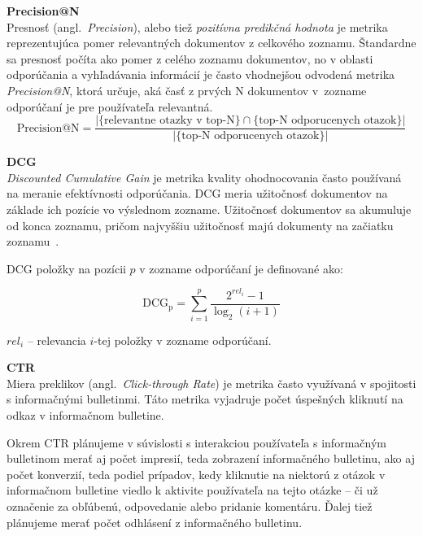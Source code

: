 \textbf{Precision@N}\\
Presnosť (angl.~\emph{Precision}), alebo tiež \textit{pozitívna predikčná hodnota} je metrika reprezentujúca pomer relevantných
dokumentov z celkového zoznamu. Štandardne sa presnosť počíta ako pomer z celého zoznamu dokumentov, no v oblasti
odporúčania a vyhľadávania informácií je často vhodnejšou odvodená metrika \textit{Precision@N}, ktorá určuje, aká časť
z prvých N dokumentov v~zozname odporúčaní je pre používateľa relevantná.
$$\mbox{Precision@N}=\frac{|\{\mbox{relevantne otazky v top-N}\}\cap\{\mbox{top-N odporucenych otazok}\}|}{|\{\mbox{top-N odporucenych otazok}\}|}$$

\textbf{DCG}\\
\textit{Discounted Cumulative Gain} je metrika kvality ohodnocovania často používaná na meranie efektívnosti
odporúčania. DCG meria užitočnosť dokumentov na základe ich pozície vo výslednom zozname. Užitočnosť dokumentov sa akumuluje
od konca zoznamu, pričom najvyššiu užitočnosť majú dokumenty na začiatku zoznamu~\cite{Jrvelin2002}.

DCG položky na pozícii $p$ v zozname odporúčaní je definované ako:

$$\mathrm{DCG_{p}} = \sum_{i=1}^{p} \frac{ 2^{rel_{i}} - 1 }{ \log_{2}(i+1)}$$
\begin{adjustwidth}{1cm}{1cm}
$rel_i$ -- relevancia $i$-tej položky v zozname odporúčaní.\\
\end{adjustwidth}

\textbf{CTR}\\
Miera preklikov (angl.~\emph{Click-through Rate}) je metrika často využívaná v spojitosti s informačnými bulletinmi.
Táto metrika vyjadruje počet úspešných kliknutí na odkaz v informačnom bulletine.

Okrem CTR plánujeme v súvislosti s interakciou používateľa s informačným bulletinom merať aj počet impresií,
teda zobrazení informačného bulletinu, ako aj počet konverzií, teda podiel prípadov, kedy kliknutie na niektorú z otázok
v informačnom bulletine viedlo k aktivite používateľa na tejto otázke -- či už označenie za obľúbenú,
odpovedanie alebo pridanie komentáru. Ďalej tiež plánujeme merať počet odhlásení z informačného bulletinu.
